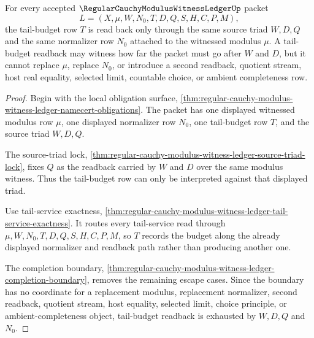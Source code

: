 \begin{theorem}
\label{thm:regular-cauchy-modulus-witness-ledger-tail-budget-readback}
For every accepted $\RegularCauchyModulusWitnessLedgerUp$ packet
$$
L=(X,\mu,W,N_0,T,D,Q,S,H,C,P,M),
$$
the tail-budget row $T$ is read back only through the same source triad $W,D,Q$ and the same normalizer row $N_0$ attached to the witnessed modulus $\mu$. A tail-budget readback may witness how far the packet must go after $W$ and $D$, but it cannot replace $\mu$, replace $N_0$, or introduce a second readback, quotient stream, host real equality, selected limit, countable choice, or ambient completeness row.
\end{theorem}
\begin{proof}
Begin with the local obligation surface, \autoref{thm:regular-cauchy-modulus-witness-ledger-namecert-obligations}. The packet has one displayed witnessed modulus row $\mu$, one displayed normalizer row $N_0$, one tail-budget row $T$, and the source triad $W,D,Q$.

The source-triad lock, \autoref{thm:regular-cauchy-modulus-witness-ledger-source-triad-lock}, fixes $Q$ as the readback carried by $W$ and $D$ over the same modulus witness. Thus the tail-budget row can only be interpreted against that displayed triad.

Use tail-service exactness, \autoref{thm:regular-cauchy-modulus-witness-ledger-tail-service-exactness}. It routes every tail-service read through $\mu,W,N_0,T,D,Q,S,H,C,P,M$, so $T$ records the budget along the already displayed normalizer and readback path rather than producing another one.

The completion boundary, \autoref{thm:regular-cauchy-modulus-witness-ledger-completion-boundary}, removes the remaining escape cases. Since the boundary has no coordinate for a replacement modulus, replacement normalizer, second readback, quotient stream, host equality, selected limit, choice principle, or ambient-completeness object, tail-budget readback is exhausted by $W,D,Q$ and $N_0$.
\end{proof}

